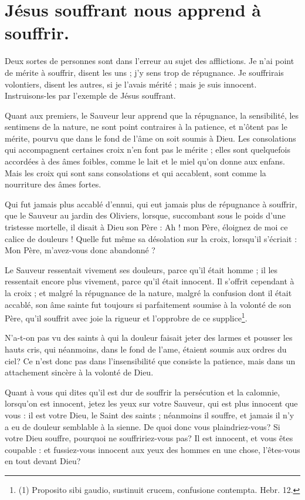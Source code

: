 \documentclass[instructions.tex]{subfiles}
\begin{document}
 
\chapter{Jésus souffrant nous apprend à souffrir.}
 
Deux sortes de personnes sont dans l’erreur au sujet des afflictions. Je n’ai point de mérite à souffrir, disent les uns ; j’y sens trop de répugnance. Je souffrirais volontiers, disent les autres, si je l’avais mérité ; mais je suis innocent. Instruisons-les par l’exemple de Jésus souffrant.
 
\primo Quant aux premiers, le Sauveur leur apprend que la répugnance, la sensibilité, les sentimens de la nature, ne sont point contraires à la patience, et n’ôtent pas le mérite, pourvu que dans le fond de l’âme on soit soumis à Dieu. Les consolations qui accompagnent certaines croix n’en font pas le mérite ; elles sont quelquefois accordées à des âmes foibles, comme le lait et le miel qu’on donne aux enfans. Mais les croix qui sont sans consolations et qui accablent, sont comme la nourriture des âmes fortes.
 
Qui fut jamais plus accablé d’ennui, qui eut jamais plus de répugnance à souffrir, que le Sauveur au jardin des Oliviers, lorsque, succombant sous le poids d’une tristesse mortelle, il disait à Dieu son Père : Ah ! mon Père, éloignez de moi ce calice de douleurs ! Quelle fut même sa désolation sur la croix, lorsqu’il s’écriait : Mon Père, m’avez-vous donc abandonné ?
 
Le Sauveur ressentait vivement ses douleurs, parce qu’il était homme ; il les ressentait encore plus vivement, parce qu’il était innocent. Il s’offrit cependant à la croix ; et malgré la répugnance de la nature, malgré la confusion dont il était accablé, son âme sainte fut toujours si parfaitement soumise à la volonté de son Père, qu’il souffrit avec joie la rigueur et l’opprobre de ce supplice\footnote{(1) Proposito sibi gaudio, sustinuit crucem, confusione contempta. Hebr. 12.}.
 
N’a-t-on pas vu des saints à qui la douleur faisait jeter des larmes et pousser les hauts cris, qui néanmoins, dans le fond de l’ame, étaient soumis aux ordres du ciel? Ce n’est donc pas dans l’insensibilité que consiste la patience, mais dans un attachement sincère à la volonté de Dieu.
 
\secundo Quant à vous qui dites qu’il est dur de souffrir la persécution et la calomnie, lorsqu’on est innocent, jetez les yeux sur votre Sauveur, qui est plus innocent que vous : il est votre Dieu, le Saint des saints ; néanmoins il souffre, et jamais il n’y a eu de douleur semblable à la sienne. De quoi donc vous plaindriez-vous? Si votre Dieu souffre, pourquoi ne souffririez-vous pas? Il est innocent, et vous êtes coupable : et fussiez-vous innocent aux yeux des hommes en une chose, l’êtes-vous en tout devant Dieu?
 
\end{document}
